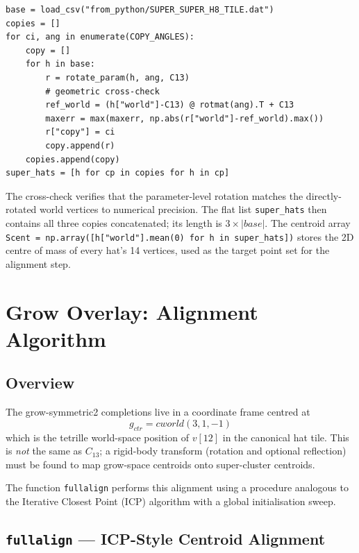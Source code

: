\documentclass[10pt,a4paper]{article}
\let\polysection\section
\renewcommand\section{\needspace{0.16\textheight}\polysection}
\let\polysubsection\subsection
\renewcommand\subsection{\needspace{0.12\textheight}\polysubsection}
\newcommand{\code}[1]{\texttt{\small #1}}
\begin{document}
\begin{verbatim}
base = load_csv("from_python/SUPER_SUPER_H8_TILE.dat")
copies = []
for ci, ang in enumerate(COPY_ANGLES):
    copy = []
    for h in base:
        r = rotate_param(h, ang, C13)
        # geometric cross-check
        ref_world = (h["world"]-C13) @ rotmat(ang).T + C13
        maxerr = max(maxerr, np.abs(r["world"]-ref_world).max())
        r["copy"] = ci
        copy.append(r)
    copies.append(copy)
super_hats = [h for cp in copies for h in cp]
\end{verbatim}

\noindent The cross-check verifies that the parameter-level rotation matches the
directly-rotated world vertices to numerical precision.  The flat list
\code{super\_hats} then contains all three copies concatenated; its length is
$3 \times |\mathit{base}|$.  The centroid array
\code{Scent = np.array([h["world"].mean(0) for h in super\_hats])} stores
the 2D centre of mass of every hat's 14 vertices, used as the target point set
for the alignment step.

\section{Grow Overlay: Alignment Algorithm}

\subsection{Overview}

The grow-symmetric2 completions live in a coordinate frame centred at
\[
  g_{\mathit{ctr}} = \mathit{cworld}(3, 1, -1)
\]
which is the tetrille world-space position of $v[12]$ in the canonical hat
tile.  This is \emph{not} the same as $C_{13}$; a rigid-body transform
(rotation and optional reflection) must be found to map grow-space centroids
onto super-cluster centroids.

The function \code{fullalign} performs this alignment using a procedure
analogous to the Iterative Closest Point (ICP) algorithm with a global
initialisation sweep.

\subsection{\code{fullalign} — ICP-Style Centroid Alignment}
\end{document}
